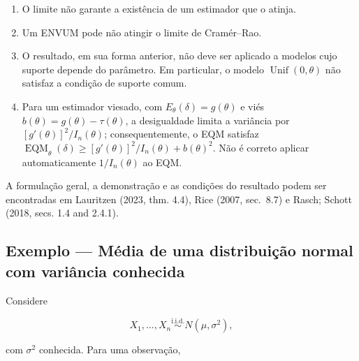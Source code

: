 \documentclass[
  letterpaper,
  DIV=11,
  numbers=noendperiod]{scrreprt}
\providecommand{\tightlist}{%
  \setlength{\itemsep}{0pt}\setlength{\parskip}{0pt}}\usepackage{longtable,booktabs,array}
\begin{document}
\begin{tcolorbox}[enhanced jigsaw, colback=white, leftrule=.75mm, colbacktitle=quarto-callout-warning-color!10!white, breakable, titlerule=0mm, bottomtitle=1mm, title=\textcolor{quarto-callout-warning-color}{\faExclamationTriangle}\hspace{0.5em}{Observações}, colframe=quarto-callout-warning-color-frame, toprule=.15mm, opacityback=0, bottomrule=.15mm, opacitybacktitle=0.6, arc=.35mm, toptitle=1mm, rightrule=.15mm, coltitle=black, left=2mm]

\begin{enumerate}
\def\labelenumi{\arabic{enumi}.}
\tightlist
\item
  O limite não garante a existência de um estimador que o atinja.
\item
  Um ENVUM pode não atingir o limite de Cramér--Rao.
\item
  O resultado, em sua forma anterior, não deve ser aplicado a modelos
  cujo suporte depende do parâmetro. Em particular, o modelo
  \(\operatorname{Unif}(0,\theta)\) não satisfaz a condição de suporte
  comum.
\item
  Para um estimador viesado, com \(E_\theta(\delta)=g(\theta)\) e viés
  \(b(\theta)=g(\theta)-\tau(\theta)\), a desigualdade limita a
  variância por \([g'(\theta)]^2/I_n(\theta)\); consequentemente, o EQM
  satisfaz
  \(\operatorname{EQM}_\theta(\delta)\geq[g'(\theta)]^2/I_n(\theta)+b(\theta)^2\).
  Não é correto aplicar automaticamente \(1/I_n(\theta)\) ao EQM.
\end{enumerate}

\end{tcolorbox}

A formulação geral, a demonstração e as condições do resultado podem ser
encontradas em Lauritzen (2023, thm. 4.4), Rice (2007, sec.~8.7) e
Rasch; Schott (2018, secs. 1.4 and 2.4.1).

\subsection*{Exemplo --- Média de uma distribuição normal com variância
conhecida}\label{exemplo-muxe9dia-de-uma-distribuiuxe7uxe3o-normal-com-variuxe2ncia-conhecida}

Considere

\[X_1,\ldots,X_n
\overset{\mathrm{i.i.d.}}{\sim}
N(\mu,\sigma^2),\]

com \(\sigma^2\) conhecida. Para uma observação,
\end{document}
